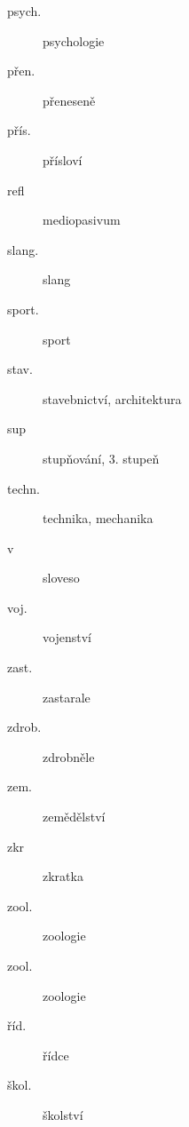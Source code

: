 \documentclass[twocolumn]{book}
\begin{document}
\begin{description}
\item[\small{psych.}] \small{psychologie}
\item[\small{přen.}] \small{přeneseně}
\item[\small{přís.}] \small{přísloví}
\item[\small{refl}] \small{mediopasivum}
\item[\small{slang.}] \small{slang}
\item[\small{sport.}] \small{sport}
\item[\small{stav.}] \small{stavebnictví, architektura}
\item[\small{sup}] \small{stupňování, 3. stupeň}
\item[\small{techn.}] \small{technika, mechanika}
\item[\small{v}] \small{sloveso}
\item[\small{voj.}] \small{vojenství}
\item[\small{zast.}] \small{zastarale}
\item[\small{zdrob.}] \small{zdrobněle}
\item[\small{zem.}] \small{zemědělství}
\item[\small{zkr}] \small{zkratka}
\item[\small{zool.}] \small{zoologie}
\item[\small{zool.}] \small{zoologie}
\item[\small{říd.}] \small{řídce}
\item[\small{škol.}] \small{školství}
\end{description}
\clearpage
\makeatletter\@openrightfalse
\end{document}
